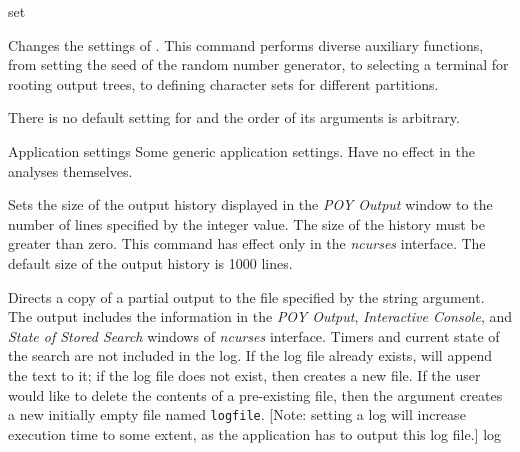 \begin{command}{set}{}


	\begin{poydescription}
            Changes the settings of \poy. This command performs diverse auxiliary 
            functions, from setting the seed of the random number generator, to
            selecting a terminal for rooting output trees, to defining character sets
            for different partitions.
            
            There is no default setting for  and the order of its
            arguments is arbitrary.
            
	\end{poydescription}

	\begin{arguments}

        \begin{argumentgroup}{Application settings}
            {Some generic application settings. Have no effect in the analyses
            themselves.}
             
                {Sets the size of the \poy output history displayed in the
                \emph{POY Output} window to the number of lines specified by the
                integer value. The size of the history must be greater than
                zero. This command has effect only in the \emph{ncurses} interface. The
                default size of the output history is 1000 lines.}
                 {}

                {Directs a copy of a partial output to the file specified by the
                string  argument. The output includes the  information in the
                \emph{POY Output}, \emph{Interactive Console}, and \emph{State
                of Stored Search} windows of \emph{ncurses} interface.  Timers and
                current state of the search are not included in the log. If the
                log file already exists, \poy will append the text to it; if the log
                file does not exist, then \poy creates a new file. If the user
                would like to delete the contents of a pre-existing file, then
                the argument  creates a new
                initially empty file named \texttt{logfile}. [Note: setting a log will 
                increase execution time to some extent, as the application has
                to output this log file.]}
                {log}


\end{argumentgroup}
\end{arguments}
\end{command}
